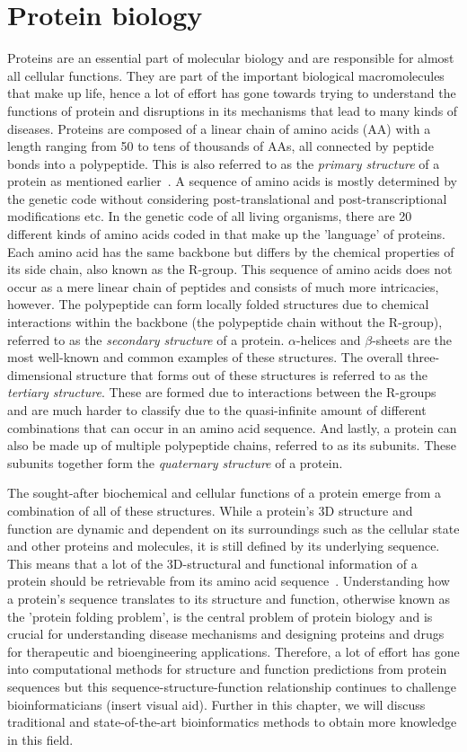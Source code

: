 \section{Protein biology}
Proteins are an essential part of molecular biology and are responsible for almost all cellular functions. They are part of the important biological macromolecules that make up life, hence a lot of effort has gone towards trying to understand the functions of protein and disruptions in its mechanisms that lead to many kinds of diseases. Proteins are composed of a linear chain of amino acids (AA) with a length ranging from 50 to tens of thousands of AAs, all connected by peptide bonds into a polypeptide. This is also referred to as the \textit{primary structure} of a protein as mentioned earlier~\cite{primstruct}. A sequence of amino acids is mostly determined by the genetic code without considering post-translational and post-transcriptional modifications etc. In the genetic code of all living organisms, there are 20 different kinds of amino acids coded in that make up the 'language' of proteins. Each amino acid has the same backbone but differs by the chemical properties of its side chain, also known as the R-group. This sequence of amino acids does not occur as a mere linear chain of peptides and consists of much more intricacies, however. The polypeptide can form locally folded structures due to chemical interactions within the backbone (the polypeptide chain without the R-group), referred to as the \textit{secondary structure} of a protein. $\alpha$-helices and $\beta$-sheets are the most well-known and common examples of these structures. The overall three-dimensional structure that forms out of these structures is referred to as the \textit{tertiary structure}. These are formed due to interactions between the R-groups and are much harder to classify due to the quasi-infinite amount of different combinations that can occur in an amino acid sequence. And lastly, a protein can also be made up of multiple polypeptide chains, referred to as its subunits. These subunits together form the \textit{quaternary structure} of a protein.

The sought-after biochemical and cellular functions of a protein emerge from a combination of all of these structures. While a protein's 3D structure and function are dynamic and dependent on its surroundings such as the cellular state and other proteins and molecules, it is still defined by its underlying sequence. This means that a lot of the 3D-structural and functional information of a protein should be retrievable from its amino acid sequence~\cite{structure}. Understanding how a protein's sequence translates to its structure and function, otherwise known as the 'protein folding problem', is the central problem of protein biology and is crucial for understanding disease mechanisms and designing proteins and drugs for therapeutic and bioengineering applications. Therefore, a lot of effort has gone into computational methods for structure and function predictions from protein sequences but this sequence-structure-function relationship continues to challenge bioinformaticians (insert visual aid). Further in this chapter, we will discuss traditional and state-of-the-art bioinformatics methods to obtain more knowledge in this field.

